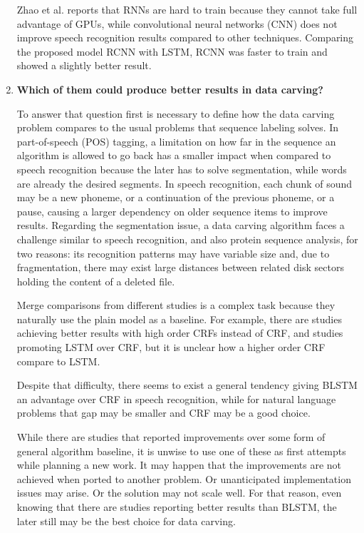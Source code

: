 \begin{enumerate}[itemindent=\parindent,label=\textbf{RQ\arabic*.}]
    Zhao et al. \cite{7953168} 
    reports that RNNs are hard to train because they cannot take full advantage of GPUs, while convolutional neural networks (CNN) does not improve speech recognition results compared to other techniques.
    Comparing the proposed model RCNN with LSTM, RCNN was faster to train and showed a slightly better result.







    \item   \textbf{Which of them could produce better results in data carving?}
    
    To answer that question first is necessary to define how the data carving problem compares to the usual problems that sequence labeling solves. In part-of-speech (POS) tagging, a limitation on how far in the sequence an algorithm is allowed to go back has a smaller impact when compared to speech recognition because the later has to solve segmentation, while words are already the desired segments. In speech recognition, each chunk of sound may be a new phoneme, or a continuation of the previous phoneme, or a pause, causing a larger dependency on older sequence items to improve results.
    Regarding the segmentation issue, a data carving algorithm faces a challenge similar to speech recognition, and also protein sequence analysis, for two reasons: its recognition patterns may have variable size and, due to fragmentation, there may exist large distances between related disk sectors holding the content of a deleted file.
    
    Merge comparisons from different studies is a complex task because they naturally use the plain model as a baseline. For example, there are studies achieving better results with high order CRFs instead of CRF, and studies promoting LSTM over CRF, but it is unclear how a higher order CRF compare to LSTM.
    
    Despite that difficulty, there seems to exist a general tendency giving BLSTM an advantage over CRF in speech recognition, while for natural language problems that gap may be smaller and CRF may be a good choice.
    
    While there are studies that reported improvements over some form of general algorithm baseline, it is unwise to use one of these as first attempts while planning a new work. It may happen that the improvements are not achieved when ported to another problem. Or unanticipated implementation issues may arise. Or the solution may not scale well. For that reason, even knowing that there are studies reporting better results than BLSTM, the later still may be the best choice for data carving.
\end{enumerate}
